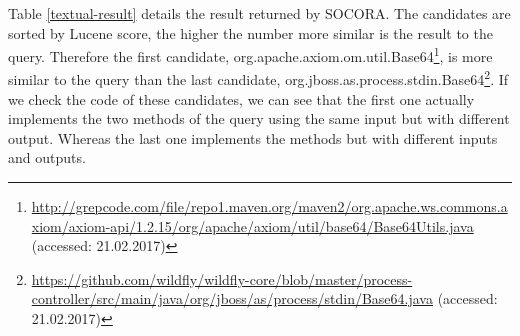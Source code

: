 Table \ref{textual-result} details the result returned by SOCORA. The candidates are sorted by Lucene score, the higher the number more similar is the result to the query. Therefore the first candidate, org.apache.axiom.om.util.Base64\footnote{\url{http://grepcode.com/file/repo1.maven.org/maven2/org.apache.ws.commons.axiom/axiom-api/1.2.15/org/apache/axiom/util/base64/Base64Utils.java} (accessed: 21.02.2017)}, is more similar to the query than the last candidate, org.jboss.as.process.stdin.Base64\footnote{\url{https://github.com/wildfly/wildfly-core/blob/master/process-controller/src/main/java/org/jboss/as/process/stdin/Base64.java} (accessed: 21.02.2017)}. If we check the code of these candidates, we can see that the first one actually implements the two methods of the query using the same input but with different output. Whereas the last one implements the methods but with different inputs and outputs.

